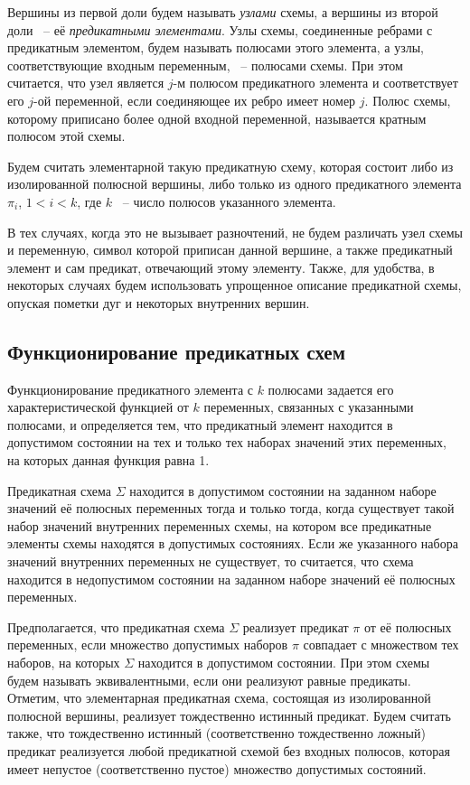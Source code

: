 \documentclass[12pt]{article}
\begin{document}
Вершины из первой доли будем называть \textit{узлами} схемы, а вершины из второй доли ~-- её \textit{предикатными элементами}. 
Узлы схемы, соединенные ребрами с предикатным элементом, будем называть полюсами этого элемента, 
а узлы, соответствующие входным переменным, ~-- полюсами схемы.
При этом считается, что узел является $j$-м полюсом предикатного элемента и соответствует 
его $j$-ой переменной, если соединяющее их ребро имеет номер $j$. Полюс схемы, которому приписано 
более одной входной переменной, называется кратным полюсом этой схемы. 

Будем считать элементарной такую предикатную схему, которая состоит либо из изолированной полюсной вершины, 
либо только из одного предикатного элемента $\pi_i$, $1 < i < k$, где $k$ ~-- число полюсов указанного элемента.

В тех случаях, когда это не вызывает разночтений, 
не будем различать узел схемы и переменную, 
символ которой приписан данной вершине, а также предикатный элемент и сам предикат, отвечающий этому элементу. 
Также, для удобства, в некоторых случаях будем использовать упрощенное описание предикатной схемы, 
опуская пометки дуг и некоторых внутренних вершин. 

\subsection{Функционирование предикатных схем}
Функционирование предикатного элемента с $k$ полюсами задается его характеристической функцией от $k$ переменных, 
связанных с указанными полюсами, и определяется тем, что предикатный элемент находится в допустимом состоянии на тех и 
только тех наборах значений этих переменных, на которых данная функция равна 1. 

Предикатная схема $\Sigma$ находится в допустимом состоянии на заданном наборе значений её полюсных переменных тогда и только тогда, 
когда существует такой набор значений внутренних переменных схемы, на котором все предикатные элементы схемы находятся в допустимых состояниях. 
Если же указанного набора значений внутренних переменных не существует, то считается, что схема находится в недопустимом состоянии на 
заданном наборе значений её полюсных переменных.

Предполагается, что предикатная схема $\Sigma$ реализует предикат $\pi$ от её полюсных переменных, если множество допустимых наборов $\pi$ 
совпадает с множеством тех наборов, на которых $\Sigma$ находится в допустимом состоянии. 
При этом схемы будем называть эквивалентными, если они реализуют равные предикаты. 
Отметим, что элементарная предикатная схема, состоящая из изолированной полюсной вершины, реализует тождественно истинный предикат.
 Будем считать также, что тождественно истинный (соответственно тождественно ложный)
 предикат реализуется любой предикатной схемой без входных полюсов, 
которая имеет непустое (соответственно пустое) множество допустимых состояний.
\end{document}
